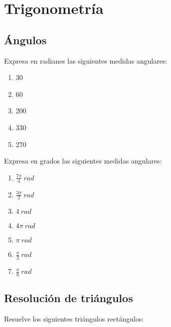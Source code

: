 \chapter{Trigonometría}
\setcounter{exercicio}{0}

\section{Ángulos}

\Exercicio Expresa en radianes las siguientes medidas angulares:

\begin{enumerate}[topsep=0pt]
	\item 30\textdegree
	\item 60\textdegree
	\item 200\textdegree
	\item 330\textdegree
	\item 270\textdegree
\end{enumerate}


\Exercicio Expresa en grados las siguientes medidas angulares:

\begin{enumerate}[topsep=0pt]
	\item $ \frac{7\pi}{3}~rad $
	\item $ \frac{3\pi}{2}~rad $
	\item $ 4~rad$
	\item $ 4\pi~rad $
	\item $ \pi~rad $
	\item $ \frac{\pi}{2}~rad $
	\item $ \frac{\pi}{6}~rad $
\end{enumerate}

\section{Resolución de triángulos}

\Exercicio Resuelve los siguientes triángulos rectángulos:

